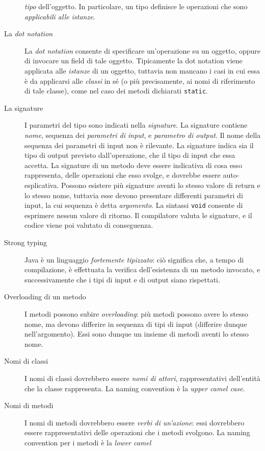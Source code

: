 \documentclass[\fontsizeclass,twocolumn]{\classname}
\theoremstyle{definition}
\theoremstyle{definition}
\begin{document}
\begin{description}
  \emph{tipo} dell'oggetto. In particolare, un tipo definisce le operazioni che
  sono \emph{applicabili alle istanze}.
  \item[La \emph{dot notation}] La \emph{dot notation} consente di specificare
  un'operazione su un oggetto, oppure di invocare un field di tale oggetto.
  Tipicamente la dot notation viene applicata alle \emph{istanze} di un oggetto,
  tuttavia non mancano i casi in cui essa è da applicarsi alle \emph{classi} in
  sé (o più precisamente, ai nomi di riferimento di tale classe), come nel caso
  dei metodi dichiarati \texttt{static}.
  \item[La signature] I parametri del tipo sono indicati nella \emph{signature}.
  La signature contiene \emph{nome}, sequenza dei \emph{parametri di input}, e
  \emph{parametro di output}. Il nome della sequenza dei parametri di input non
  è rilevante.  La signature indica sia il tipo di output previsto
  dall'operazione, che il tipo di input che essa accetta. La signature di un
  metodo deve essere indicativa di cosa esso rappresenta, delle operazioni che
  esso svolge, e dovrebbe essere auto-esplicativa. Possono esistere più
  signature aventi lo stesso valore di return e lo stesso nome, tuttavia esse
  devono presentare differenti parametri di input, la cui sequenza è detta
  \emph{argomento}. La sintassi \texttt{void} consente di esprimere nessun
  valore di ritorno. Il compilatore valuta le signature, e il codice viene poi
  valutato di conseguenza.
  \item[Strong typing] Java è un linguaggio \emph{fortemente tipizzato}: ciò
  significa che, a tempo di compilazione, è effettuata la verifica
  dell'esistenza di un metodo invocato, e successivamente che i tipi di input e
  di output siano rispettati.
  \item[Overloading di un metodo] I metodi possono subire \emph{overloading}:
  più metodi possono avere lo stesso nome, ma devono differire in sequenza di
  tipi di input (differire dunque nell'argomento). Essi sono dunque un insieme
  di metodi aventi lo stesso nome.
  \item[Nomi di classi] I nomi di classi dovrebbero essere \emph{nomi di attori},
  rappresentativi dell'entità che la classe rappresenta. La naming convention è
  la \emph{upper camel case}.
  \item[Nomi di metodi] I nomi di metodi dovrebbero essere \emph{verbi di
  un'azione}: essi dovrebbero essere rappresentativi delle operazioni che i
  metodi svolgono. La naming convention per i metodi è la \emph{lower camel
}
\end{description}
\end{document}
